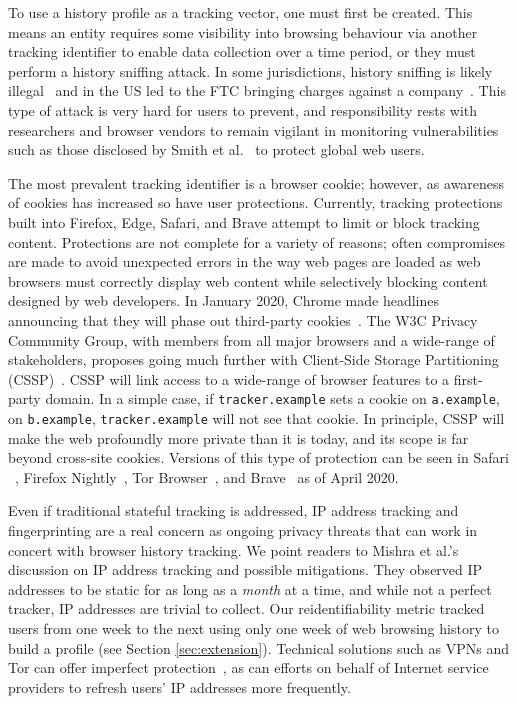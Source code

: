 \documentclass[letterpaper,twocolumn,10pt]{article}
\begin{document}
To use a history profile as a tracking vector, one must first be created. 
This means an entity requires some visibility into browsing behaviour via another tracking identifier to enable data collection over a time period, or they must perform a history sniffing attack. 
In some jurisdictions, history sniffing is likely illegal~\cite{bellovinHistorySniffing2012} and in the US led to the FTC bringing charges against a company~\cite{FTCApprovesFinal2013}.
This type of attack is very hard for users to prevent, and responsibility rests with researchers and browser vendors to remain vigilant in monitoring vulnerabilities such as those disclosed by Smith et al.~\cite{smithBrowserHistoryRe2018} to protect global web users.

The most prevalent tracking identifier is a browser cookie; however, as awareness of cookies has increased so have user protections.
Currently, tracking protections built into Firefox, Edge, Safari, and Brave attempt to limit or block tracking content. 
Protections are not complete for a variety of reasons; often compromises are made to avoid unexpected errors in the way web pages are loaded as web browsers must correctly display web content while selectively blocking content designed by web developers.
In January 2020, Chrome made headlines announcing that they will phase out third-party cookies~\cite{BuildingMorePrivatea}.
The W3C Privacy Community Group, with members from all major browsers and a wide-range of stakeholders, proposes going much further with Client-Side Storage Partitioning (CSSP)~\cite{w3cprivacycommunitygroupClientSideStoragePartitioning}.
CSSP will link access to a wide-range of browser features to a first-party domain.
In a simple case, if \texttt{tracker.example} sets a cookie on \texttt{a.example}, on \texttt{b.example}, \texttt{tracker.example} will not see that cookie.
In principle, CSSP will make the web profoundly more private than it is today, and its scope is far beyond cross-site cookies.
Versions of this type of protection can be seen in Safari ~\cite{wilanderFullThirdPartyCookie2020,wilanderIntroducingStorageAccess2018}, Firefox Nightly~\cite{MozillaAddsDynamic}, Tor Browser~\cite{DesignImplementationTora}, and Brave~\cite{braveOKGoogleDon2020} as of April 2020.

Even if traditional stateful tracking is addressed, IP address tracking and fingerprinting are a real concern as ongoing privacy threats that can work in concert with browser history tracking.
We point readers to Mishra et al.'s~\cite{mishra:hal-02435622} discussion on IP address tracking and possible mitigations.
They observed IP addresses to be static for as long as a \textit{month} at a time, and while not a perfect tracker, IP addresses are trivial to collect.
Our reidentifiability metric tracked users from one week to the next using only one week of web browsing history to build a profile (see Section \ref{sec:extension}).
Technical solutions such as VPNs and Tor can offer imperfect protection~\cite{mishra:hal-02435622, padmanabhanReasonsDynamicAddresses2016}, as can efforts on behalf of Internet service providers to refresh users' IP addresses more frequently.
\end{document}
